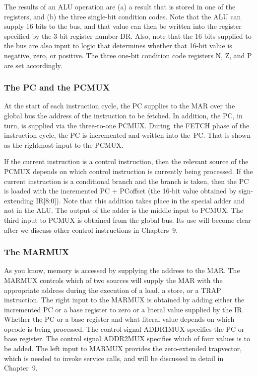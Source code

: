 \documentclass{patt}
\begin{document}
The results of an ALU operation are (a) a result that is stored in one of
the registers, and (b) the three single-bit condition codes.  Note that
the ALU can supply 16 bits to the bus, and that value can then be
written into the register specified by the 3-bit register number DR.
Also, note that the 16 bits supplied to the bus are also input to
logic that determines whether that 16-bit value is negative, zero,
or positive. The three one-bit condition code registers N, Z, and P are 
set accordingly.

\subsubsection{The PC and the PCMUX}

At the start of each instruction cycle, the PC supplies to the MAR over the
global bus the address of the instruction to be fetched.  In addition, the  
PC, in turn, is supplied via the three-to-one PCMUX.  During~the FETCH phase 
of the instruction cycle, the PC is incremented and written into the~PC.  
That is shown as the rightmost input to the PCMUX.

If the current instruction is a control instruction, then the relevant
source of the PCMUX depends on which control instruction is currently
being processed.  If the current instruction is a conditional branch
and the branch is taken, then the PC is loaded with the incremented PC
$+$ PCoffset (the 16-bit value obtained by sign-extending IR[8:0]).
Note that this addition takes place in the special adder and not in
the ALU.  The output of the adder is the middle input to PCMUX.  The
third input to PCMUX is obtained from the global bus.  Its use will
become clear after we discuss other control instructions in Chapters~9.

\subsubsection{The MARMUX}

As you know, memory is accessed by supplying the address to the MAR.
The MARMUX controls which of two sources will supply the MAR with the
appropriate address during the execution of a load, a store, or a TRAP
instruction.  The right input to the MARMUX is obtained by adding
either the incremented PC or a base register to zero or a literal value
supplied by the IR.  Whether the PC or a base register and what
literal value depends on which opcode is being processed.  The control
signal ADDR1MUX specifies the PC or base register.  The control signal
ADDR2MUX specifies which of four values is to be added.  The left input
to MARMUX provides the zero-extended trapvector, which is needed to
invoke service calls, and will be discussed in detail in Chapter~9.
\end{document}
